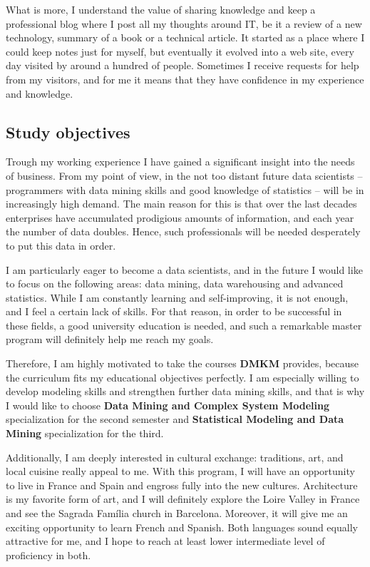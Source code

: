 \documentclass[a4paper,12pt]{article}
\begin{document}
What is more, I understand the value of sharing knowledge and keep a professional blog where I post all my thoughts around IT, be it a review of a new technology, summary of a book or a technical article. It started as a place where I could keep notes just for myself, but eventually it evolved into a web site, every day visited by around a hundred of people. Sometimes I receive requests for help from my visitors, and for me it means that they have confidence in my experience and knowledge.

\subsection*{Study objectives}

Trough my working experience I have gained a significant insight into the needs of business. From my point of view, in the not too distant future data scientists -- programmers with data mining skills and good knowledge of statistics -- will be in increasingly high demand. The main reason for this is that over the last decades enterprises have accumulated prodigious amounts of information, and each year the number of data doubles. Hence, such professionals will be needed desperately to put this data in order.

I am particularly eager to become a data scientists, and in the future I would like to focus on the following areas: data mining, data warehousing and advanced statistics. While I am constantly learning and self-improving, it is not enough, and I feel a certain lack of skills. For that reason, in order to be successful in these fields, a good university education is needed, and such a remarkable master program will definitely help me reach my goals.

Therefore, I am highly motivated to take the courses \textbf{DMKM} provides, because the curriculum fits my educational objectives perfectly. I am especially willing to develop modeling skills and strengthen further data mining skills, and that is why I would like to choose \textbf{Data Mining and Complex System Modeling} specialization for the second semester and \textbf{Statistical Modeling and Data Mining} specialization for the third.

Additionally, I am deeply interested in cultural exchange: traditions, art, and local cuisine really appeal to me. With this program, I will have an opportunity to live in France and Spain and engross fully into the new cultures. Architecture is my favorite form of art, and I will definitely explore the Loire Valley in France and see the Sagrada Família church in Barcelona. Moreover, it will give me an exciting opportunity to learn French and Spanish. Both languages sound equally attractive for me, and I hope to reach at least lower intermediate level of proficiency in both.
\end{document}
